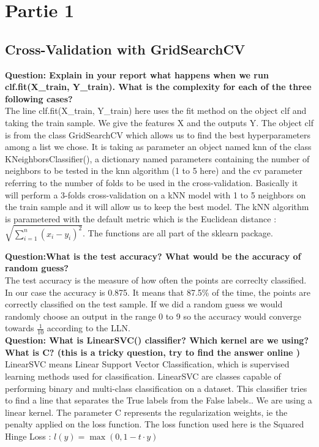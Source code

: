 \section{Partie 1}

\subsection{Cross-Validation with GridSearchCV}
\textbf{{Question}: Explain in your report what happens when we run clf.fit(X\_train, Y\_train). What is the complexity for each of the three following cases?} \\
The line clf.fit(X\_train, Y\_train) here uses the fit method on the object  clf and taking the train sample. We give the features X and the outputs Y. The object clf is from the class GridSearchCV which allows us to find the best hyperparameters among a list we chose. It is taking as parameter an object named knn of the class KNeighborsClassifier(), a dictionary named parameters containing the number of neighbors to be tested in the knn algorithm (1 to 5 here) and the cv parameter referring to the number of folds to be used in the cross-validation. Basically it will perform a 3-folds cross-validation on a kNN model with 1 to 5 neighbors on the train sample and it will allow us to keep the best model. The kNN algorithm is parametered with the default metric which is the Euclidean distance : $\sqrt{\sum^n_{i=1}(x_i - y_i)^2}$. The functions are all part of the sklearn package. \\

\textbf{{Question}:What is the test accuracy? What would be the accuracy of random guess?} \\
The test accuracy is the measure of how often the points are correclty classified. In our case the accuracy is 0.875.  It means that 87.5\% of the time, the points are correctly classified on the test sample. If we did a random guess we would randomly choose an output in the range 0 to 9 so the accuracy would converge towards $\frac{1}{10}$ according to the LLN.  \\


\textbf{{Question}:  What is LinearSVC() classifier? Which kernel are we using? What is C? (this is a tricky question, try to find the answer online )}\\
LinearSVC means Linear Support Vector Classification, which is supervised learning methods used for classification. LinearSVC are classes capable of performing binary and multi-class classification on a dataset. 
This classifier tries to find a line that separates the True labels from the False labels.. We are using a linear kernel. The parameter C represents the regularization weights, ie the penalty applied on the loss function. The loss function used here is the Squared Hinge Loss : $l(y)=\max(0,1-t\cdot y)$ \\


